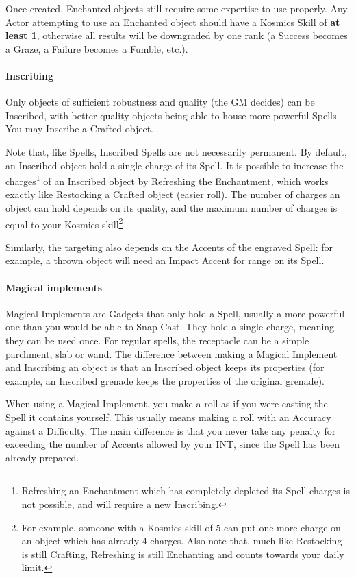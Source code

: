 Once created, Enchanted objects still require some expertise to use properly. Any Actor attempting to use an Enchanted object should have a Kosmics Skill of \textbf{at least 1}, otherwise all results will be downgraded by one rank (a Success becomes a Graze, a Failure becomes a Fumble, etc.).


\paragraph{Inscribing}

Only objects of sufficient robustness and quality (the GM decides) can be Inscribed, with better quality objects being able to house more powerful Spells. You may Inscribe a Crafted object.

Note that, like Spells, Inscribed Spells are not necessarily permanent. By default, an Inscribed object hold a single charge of its Spell. It is possible to increase the charges\footnote{Refreshing an Enchantment which has completely depleted its Spell charges is not possible, and will require a new Inscribing.} of an Inscribed object by Refreshing the Enchantment, which works exactly like Restocking a Crafted object (easier roll). The number of charges an object can hold depends on its quality, and the maximum number of charges is equal to your Kosmics skill\footnote{For example, someone with a Kosmics skill of 5 can put one more charge on an object which has already 4 charges. Also note that, much like Restocking is still Crafting, Refreshing is still Enchanting and counts towards your daily limit.}

Similarly, the targeting also depends on the Accents of the engraved Spell: for example, a thrown object will need an Impact Accent for range on its Spell.

\paragraph{Magical implements}

Magical Implements are Gadgets that only hold a Spell, usually a more powerful one than you would be able to Snap Cast. They hold a single charge, meaning they can be used once. For regular spells, the receptacle can be a simple parchment, slab or wand. The difference between making a Magical Implement and Inscribing an object is that an Inscribed object keeps its properties (for example, an Inscribed grenade keeps the properties of the original grenade).

When using a Magical Implement, you make a roll as if you were casting the Spell it contains yourself. This usually means making a roll with an Accuracy against a Difficulty. The main difference is that you never take any penalty for exceeding the number of Accents allowed by your INT, since the Spell has been already prepared.